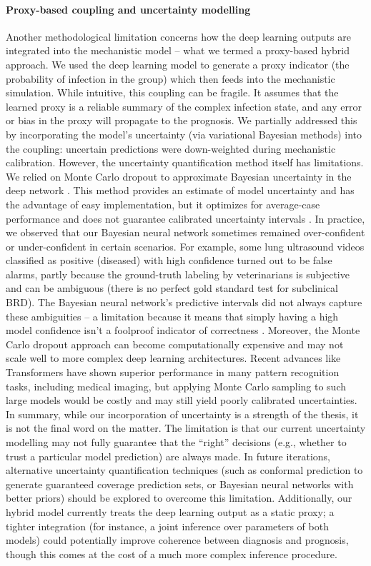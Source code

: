 \paragraph{Proxy-based coupling and uncertainty modelling} Another methodological limitation concerns how the deep learning outputs are integrated into the mechanistic model – what we termed a proxy-based hybrid approach. We used the deep learning model to generate a proxy indicator (the probability of infection in the group) which then feeds into the mechanistic simulation. While intuitive, this coupling can be fragile. It assumes that the learned proxy is a reliable summary of the complex infection state, and any error or bias in the proxy will propagate to the prognosis. We partially addressed this by incorporating the model’s uncertainty (via variational Bayesian methods) into the coupling: uncertain predictions were down-weighted during mechanistic calibration. However, the uncertainty quantification method itself has limitations. We relied on Monte Carlo dropout to approximate Bayesian uncertainty in the deep network \cite{gal_dropout_2016}. This method provides an estimate of model uncertainty and has the advantage of easy implementation, but it optimizes for average-case performance and does not guarantee calibrated uncertainty intervals \cite{matiz2020conformal}. In practice, we observed that our Bayesian neural network sometimes remained over-confident or under-confident in certain scenarios. For example, some lung ultrasound videos classified as positive (diseased) with high confidence turned out to be false alarms, partly because the ground-truth labeling by veterinarians is subjective and can be ambiguous (there is no perfect gold standard test for subclinical BRD). The Bayesian neural network’s predictive intervals did not always capture these ambiguities – a limitation because it means that simply having a high model confidence isn’t a foolproof indicator of correctness \cite{kendall2017uncertainties}. Moreover, the Monte Carlo dropout approach can become computationally expensive and may not scale well to more complex deep learning architectures. Recent advances like Transformers \cite{vaswani2017attention} have shown superior performance in many pattern recognition tasks, including medical imaging, but applying Monte Carlo sampling to such large models would be costly and may still yield poorly calibrated uncertainties. In summary, while our incorporation of uncertainty is a strength of the thesis, it is not the final word on the matter. The limitation is that our current uncertainty modelling may not fully guarantee that the “right” decisions (e.g., whether to trust a particular model prediction) are always made. In future iterations, alternative uncertainty quantification techniques (such as conformal prediction to generate guaranteed coverage prediction sets, or Bayesian neural networks with better priors) should be explored to overcome this limitation. Additionally, our hybrid model currently treats the deep learning output as a static proxy; a tighter integration (for instance, a joint inference over parameters of both models) could potentially improve coherence between diagnosis and prognosis, though this comes at the cost of a much more complex inference procedure.

